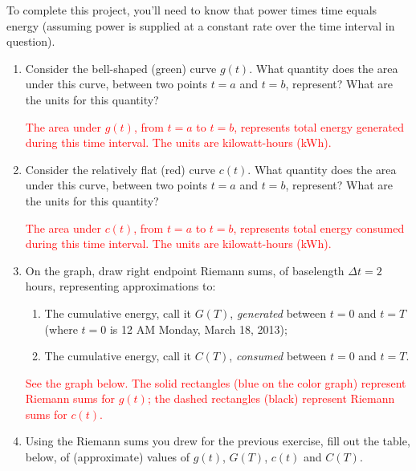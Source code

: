 \documentclass[11pt]{article}
\newcommand{\sol}[1]{\textcolor{red}{#1}}
\newcommand{\sol}[1]{\textcolor{white}{#1}}
\begin{document}
\smallskip To complete this project, you'll need to know that power times time equals energy (assuming power is supplied at a constant rate over the time interval in question).
 \begin{enumerate}

\item Consider the bell-shaped (green) curve $g(t)$. What quantity does the {area} under this curve, between two points $t=a$ and $t=b$, represent? What are the units for this quantity?

\sol{The area under $g(t)$, from $t=a$ to $t=b$, represents total energy generated during this time interval.  The units are kilowatt-hours (kWh).}

\vfill

\item Consider the relatively flat (red) curve $c(t)$. What quantity does the {area} under this curve, between two points $t=a$ and $t=b$, represent? What are the units for this quantity?

\sol{The area under $c(t)$, from $t=a$ to $t=b$, represents total energy consumed during this time interval.  The units are kilowatt-hours (kWh).}
 
 \vfill 

\item  On the graph, draw right endpoint Riemann sums, of baselength $\Delta t=2$ hours, representing approximations to:

\begin{enumerate}

\item  The cumulative energy, call it $G(T)$, {\it generated} between $t=0$ and $t=T$ (where $t=0$ is 12 AM Monday, March 18, 2013);

\item The cumulative energy, call it $C(T)$, {\it consumed} between $t=0$ and $t=T$.


\end{enumerate}

\sol{See the graph below.  The solid rectangles (blue on the color graph) represent Riemann sums for $g(t)$; the dashed rectangles (black) represent Riemann sums for $c(t)$.}
\vfill\eject

\item  Using the Riemann sums you drew for the previous exercise, fill out the table, below, of (approximate) values of $g(t)$, $G(T)$, $c(t)$ and $C(T)$.
\vspace{.3in}


\end{enumerate}
\end{document}
